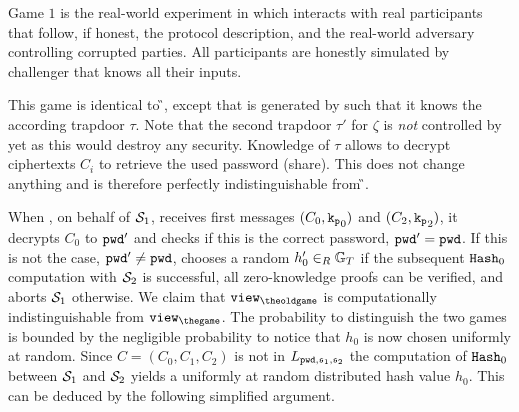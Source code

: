 \Gh Game $1$ is the real-world experiment in which \cZ interacts with real participants that follow, if honest, the protocol description, and the real-world adversary \cA controlling corrupted parties.
All participants are honestly simulated by challenger \Challenger that knows all their inputs.

\Gh This game is identical to \G{\theoldgame}, except that \crs is generated by \Challenger such that it knows the according trapdoor $\tau$.
Note that the second trapdoor $\tau'$ for $\zeta$ is \emph{not} controlled by \Challenger yet as this would destroy any security.
Knowledge of $\tau$ allows \Challenger to decrypt ciphertexts $C_i$ to retrieve the used password (share).
This does not change anything and is therefore perfectly indistinguishable from \G{\theoldgame}.

\Gh When \Challenger, on behalf of $\mathcal{S}_1$, receives first messages $(C_0, \mathtt{k_p}_0)$ and $(C_2, \mathtt{k_p}_2)$, it decrypts $C_0$ to $\mathtt{pwd}'$ and checks if this is the correct password, \ie $\mathtt{pwd}'=\mathtt{pwd}$.
If this is not the case, $\mathtt{pwd}'\not=\mathtt{pwd}$, \Challenger chooses a random $h'_0\in_R\mathbb{G}_T$ if the subsequent $\mathtt{Hash}_0$ computation with $\mathcal{S}_2$ is successful, \ie all zero-knowledge proofs can be verified, and aborts $\mathcal{S}_1$ otherwise.
We claim that $\view_{\theoldgame}$ is computationally indistinguishable from $\view_{\thegame}$.
The probability to distinguish the two games is bounded by the negligible probability to notice that $h_0$ is now chosen uniformly at random.
Since $C=(C_0, C_1, C_2)$ is not in $L_{\mathtt{pwd}, \mathfrak{s}_1, \mathfrak{s}_2}$ the computation of $\mathtt{Hash}_0$ between $\mathcal{S}_1$ and $\mathcal{S}_2$ yields a uniformly at random distributed hash value $h_0$.
This can be deduced by the following simplified argument.
